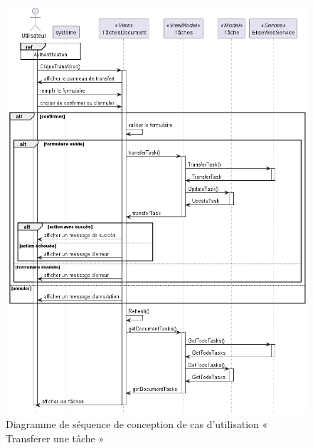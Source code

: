 \begin{figure}[H]
  \centering
  \includegraphics[width=1\textwidth]{out/diagrams/documents/sequence_transfer_task/sequence_transfer_task}
  \caption{Diagramme de séquence de conception de cas d'utilisation « Transferer une tâche »}
  \label{fig:sequence_conception_transferTask}
\end{figure}
